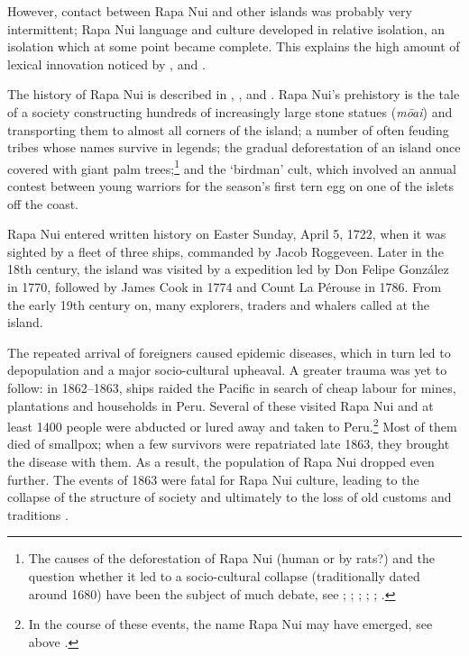 However, contact between Rapa Nui and other islands was probably very intermittent; Rapa Nui language and culture developed in relative isolation, an isolation which at some point became complete. This explains the high amount of lexical innovation noticed by \citet{Emory1963}, \citet[45]{LangdonTryon1983} and \citet[36]{Bergmann1963}.

The history of Rapa Nui is described in \citet{BahnFlenley1992}, \citet{McCall1994}, \citet{FlenleyBahn2002} and \citet{Fischer2005}. Rapa Nui’s prehistory is the tale of a society constructing hundreds of increasingly large stone statues (\textit{mōai}) and transporting them to almost all corners of the island; a number of often feuding tribes whose names survive in legends; the gradual deforestation of an island once covered with giant palm trees;\footnote{\label{fn:8}The causes of the deforestation of Rapa Nui (human or by rats?) and the question whether it led to a socio-cultural collapse (traditionally dated around 1680) have been the subject of much debate, see \citet{FlenleyBahn2002}; \citet{Diamond2005}; \citet{MulrooneyLadefoged2007,MulrooneyLadefoged2009}; \citet{Hunt2007}; \citet{MiethBork2010}; \citet{Boersema2011}.} and the ‘birdman’ cult, which involved an annual contest between young warriors for the season’s first tern egg on one of the islets off the coast.

Rapa Nui entered written history on Easter Sunday, April 5, 1722, when it was sighted by a  fleet of three ships, commanded by Jacob Roggeveen. Later in the 18th century, the island was visited by a  expedition led by Don Felipe González in 1770, followed by James Cook in 1774 and Count La Pérouse  in 1786. From the early 19th century on, many explorers, traders and whalers called at the island.

The repeated arrival of foreigners caused epidemic diseases, which in turn led to depopulation and a major socio-cultural upheaval. A greater trauma was yet to follow: in 1862–1863, ships raided the Pacific in search of cheap labour for mines, plantations and households in Peru. Several of these visited Rapa Nui and at least 1400 people were abducted or lured away and taken to Peru.\footnote{\label{fn:9}In the course of these events, the name Rapa Nui may have emerged, see  above \citep[91]{Fischer2005}.} Most of them died of smallpox; when a few survivors were repatriated late 1863, they brought the disease with them. As a result, the population of Rapa Nui dropped even further. The events of 1863 were fatal for Rapa Nui culture, leading to the collapse of the structure of society and ultimately to the loss of old customs and traditions \citep[391]{Knorozov1965}.

